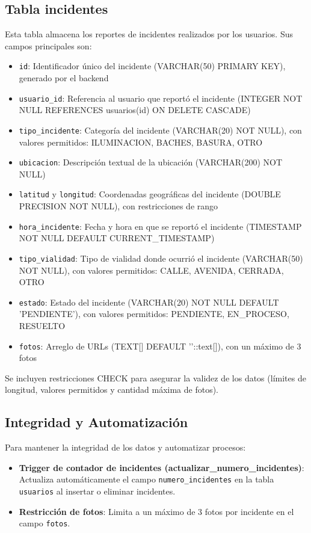 \subsection*{Tabla incidentes}
Esta tabla almacena los reportes de incidentes realizados por los usuarios. Sus campos principales son:
\begin{itemize}
    \item \texttt{id}: Identificador único del incidente (VARCHAR(50) PRIMARY KEY), generado por el backend
    \item \texttt{usuario\_id}: Referencia al usuario que reportó el incidente (INTEGER NOT NULL REFERENCES usuarios(id) ON DELETE CASCADE)
    \item \texttt{tipo\_incidente}: Categoría del incidente (VARCHAR(20) NOT NULL), con valores permitidos: ILUMINACION, BACHES, BASURA, OTRO
    \item \texttt{ubicacion}: Descripción textual de la ubicación (VARCHAR(200) NOT NULL)
    \item \texttt{latitud} y \texttt{longitud}: Coordenadas geográficas del incidente (DOUBLE PRECISION NOT NULL), con restricciones de rango
    \item \texttt{hora\_incidente}: Fecha y hora en que se reportó el incidente (TIMESTAMP NOT NULL DEFAULT CURRENT\_TIMESTAMP)
    \item \texttt{tipo\_vialidad}: Tipo de vialidad donde ocurrió el incidente (VARCHAR(50) NOT NULL), con valores permitidos: CALLE, AVENIDA, CERRADA, OTRO
    \item \texttt{estado}: Estado del incidente (VARCHAR(20) NOT NULL DEFAULT 'PENDIENTE'), con valores permitidos: PENDIENTE, EN\_PROCESO, RESUELTO
    \item \texttt{fotos}: Arreglo de URLs (TEXT[] DEFAULT '{}'::text[]), con un máximo de 3 fotos
\end{itemize}
Se incluyen restricciones CHECK para asegurar la validez de los datos (límites de longitud, valores permitidos y cantidad máxima de fotos).

\subsection*{Integridad y Automatización}
Para mantener la integridad de los datos y automatizar procesos:
\begin{itemize}
    \item \textbf{Trigger de contador de incidentes (actualizar\_numero\_incidentes)}: Actualiza automáticamente el campo \texttt{numero\_incidentes} en la tabla \texttt{usuarios} al insertar o eliminar incidentes.
    \item \textbf{Restricción de fotos}: Limita a un máximo de 3 fotos por incidente en el campo \texttt{fotos}.
\end{itemize}

